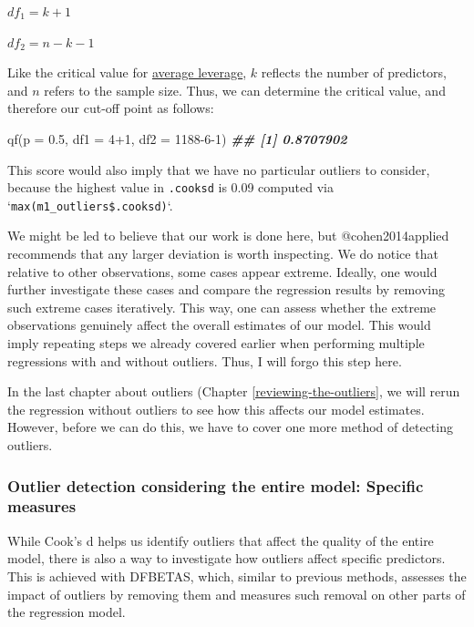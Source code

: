 \documentclass[
]{book}
\newenvironment{Shaded}{\begin{snugshade}}{\end{snugshade}}
\newcommand{\AttributeTok}[1]{\textcolor[rgb]{0.77,0.63,0.00}{#1}}
\newcommand{\DecValTok}[1]{\textcolor[rgb]{0.00,0.00,0.81}{#1}}
\newcommand{\DocumentationTok}[1]{\textcolor[rgb]{0.56,0.35,0.01}{\textbf{\textit{#1}}}}
\newcommand{\FloatTok}[1]{\textcolor[rgb]{0.00,0.00,0.81}{#1}}
\newcommand{\FunctionTok}[1]{\textcolor[rgb]{0.00,0.00,0.00}{#1}}
\newcommand{\NormalTok}[1]{#1}
\newcommand{\SpecialCharTok}[1]{\textcolor[rgb]{0.00,0.00,0.00}{#1}}
\begin{document}
\leavevmode\hypertarget{critical-value-cooks-d}{}%
\(df_1 = k +1\)

\(df_2 = n - k - 1\)

Like the critical value for \protect\hyperlink{average-leverage-equation}{average leverage}, \(k\) reflects the number of predictors, and \(n\) refers to the sample size. Thus, we can determine the critical value, and therefore our cut-off point as follows:

\begin{Shaded}
\begin{Highlighting}[]
\FunctionTok{qf}\NormalTok{(}\AttributeTok{p =} \FloatTok{0.5}\NormalTok{,}
   \AttributeTok{df1 =} \DecValTok{4}\SpecialCharTok{+}\DecValTok{1}\NormalTok{,}
   \AttributeTok{df2 =} \DecValTok{1188{-}6{-}1}\NormalTok{)}
\DocumentationTok{\#\# [1] 0.8707902}
\end{Highlighting}
\end{Shaded}

This score would also imply that we have no particular outliers to consider, because the highest value in \texttt{.cooksd} is 0.09 computed via `\texttt{max(m1\_outliers\$.cooksd)}`.

We might be led to believe that our work is done here, but @cohen2014applied recommends that any larger deviation is worth inspecting. We do notice that relative to other observations, some cases appear extreme. Ideally, one would further investigate these cases and compare the regression results by removing such extreme cases iteratively. This way, one can assess whether the extreme observations genuinely affect the overall estimates of our model. This would imply repeating steps we already covered earlier when performing multiple regressions with and without outliers. Thus, I will forgo this step here.

In the last chapter about outliers (Chapter \ref{reviewing-the-outliers}, we will rerun the regression without outliers to see how this affects our model estimates. However, before we can do this, we have to cover one more method of detecting outliers.

\hypertarget{outlier-detection-specific-measures}{%
\subsubsection{Outlier detection considering the entire model: Specific measures}\label{outlier-detection-specific-measures}}

While Cook's d helps us identify outliers that affect the quality of the entire model, there is also a way to investigate how outliers affect specific predictors. This is achieved with DFBETAS, which, similar to previous methods, assesses the impact of outliers by removing them and measures such removal on other parts of the regression model.
\end{document}
